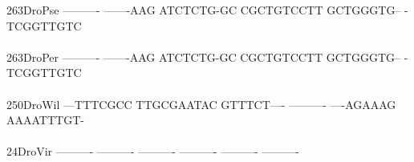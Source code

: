 \documentclass[11pt,twoside,reqno,a4paper]{article}
\begin{document}
{263\hspace*{1\charwidth}DroPse	----------	-------AAG	ATCTCTG-GC	CGCTGTCCTT	GCTGGGTG--	-TCGGTTGTC	\\
\hspace*{4\charwidth}\hspace*{7\charwidth}\hspace*{1\charwidth}\hspace*{1\charwidth}\hspace*{1\charwidth}\hspace*{1\charwidth}\hspace*{1\charwidth}\hspace*{1\charwidth}\\
263\hspace*{1\charwidth}DroPer	----------	-------AAG	ATCTCTG-GC	CGCTGTCCTT	GCTGGGTG--	-TCGGTTGTC	\\
\hspace*{4\charwidth}\hspace*{7\charwidth}\hspace*{1\charwidth}\hspace*{1\charwidth}\hspace*{1\charwidth}\hspace*{1\charwidth}\hspace*{1\charwidth}\hspace*{1\charwidth}\\
250\hspace*{1\charwidth}DroWil	---TTTCGCC	TTGCGAATAC	GTTTCT----	----------	----AGAAAG	AAAATTTGT-	\\
\hspace*{4\charwidth}\hspace*{7\charwidth}\hspace*{1\charwidth}\hspace*{1\charwidth}\hspace*{1\charwidth}\hspace*{1\charwidth}\hspace*{1\charwidth}\hspace*{1\charwidth}\\
24\hspace*{2\charwidth}DroVir	----------	----------	----------	----------	----------	----------	\\
\hspace*{4\charwidth}\hspace*{7\charwidth}\hspace*{1\charwidth}\hspace*{1\charwidth}\hspace*{1\charwidth}\hspace*{1\charwidth}\hspace*{1\charwidth}\hspace*{1\charwidth}\\
}
\end{document}
